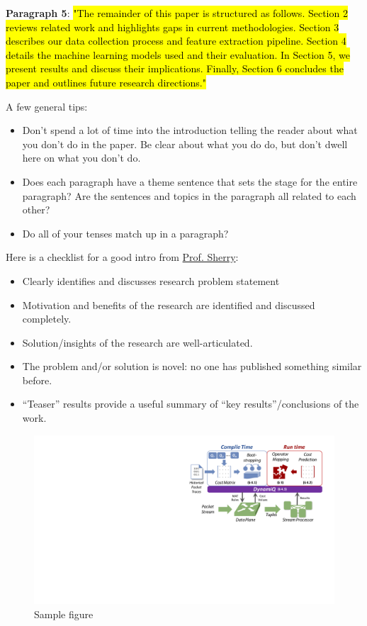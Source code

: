 \textbf{Paragraph 5}: \hl{"The remainder of this paper is structured as follows. Section 2 reviews related work and highlights gaps in current methodologies. Section 3 describes our data collection process and feature extraction pipeline. Section 4 details the machine learning models used and their evaluation. In Section 5, we present results and discuss their implications. Finally, Section 6 concludes the paper and outlines future research directions."}

A few general tips:
\begin{itemize}
    \item Don't spend a lot of time into the introduction telling the reader about what you don't do in the paper. Be clear about what you do do, but don't dwell here on what you don't do.
    \item Does each paragraph have a theme sentence that sets the stage for the entire paragraph? Are the sentences and topics in the paragraph all related to each other?
    \item Do all of your tenses match up in a paragraph?
\end{itemize}


Here is a checklist for a good intro from \href{https://docs.google.com/document/d/14g-4txTMwJ4YL61qOcaH6bJWKh59PkI1S-FB1KjeMS4/edit}{Prof. Sherry}: 
\begin{itemize}
    \item Clearly identifies and discusses research problem statement
    \item Motivation and benefits of the research are identified and discussed completely.
    \item Solution/insights of the research are well-articulated.
    \item The problem and/or solution is novel: no one has published something similar before.
    \item ``Teaser'' results provide a useful summary of ``key results''/conclusions of the work.
\end{itemize}


\begin{figure}[t] 
\includegraphics[width=\linewidth]{dynamiq-nutshell.pdf}
\caption{{Sample figure~\cite{sonata}} \label{fig:dynamiq-nutshell}
}
\vspace{-.15in}
\end{figure}
